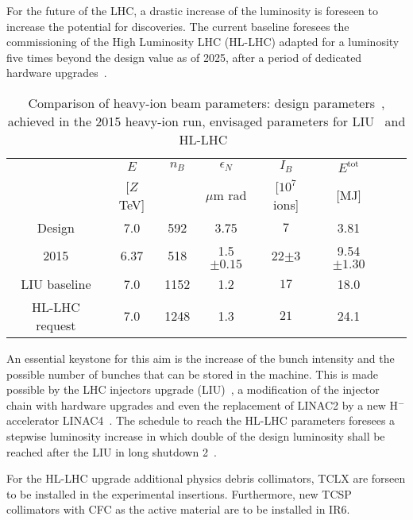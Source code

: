 For the future of the LHC, a drastic increase of the luminosity is foreseen to increase the potential for discoveries. The current baseline foresees the commissioning of the High Luminosity LHC (HL-LHC) adapted for a luminosity five times beyond the design value as of 2025, after a period of dedicated hardware upgrades~\cite{hllhc:asdhep}.
%
	\begin{table}[b]
		\centering
		\caption{Comparison of heavy-ion beam parameters: design parameters~\cite{CERN-2004-003-V1}, achieved in the 2015 heavy-ion run, envisaged parameters for LIU~\cite{IPAC11:WEPS017,IPAC2015:THPF093} and HL-LHC~\cite{}}
		\label{tab:LIU_HL_Parameters}
		
		\begin{tabular}{cccccccc}
			\toprule
			                        & $E$             & $n_B$   & $\epsilon_N$  & $I_B$             & $E^\text{tot}$     \\ %
			                        & {[}$Z$ TeV{]}	  &         &  $\mu$m rad   &  [$10^7$ ions]     & [MJ]             \\ \midrule
			Design                  & 7.0             & 592     & 3.75 & $7$               & 3.81             \\
			2015                    & 6.37            & 518     & 1.5$\pm 0.15$ & 22$\pm3$              & 9.54$\pm1.30$             \\
			LIU baseline            & 7.0             & 1152    & 1.2  & $17$              & 18.0             \\
			HL-LHC request          & 7.0             & 1248    & 1.3 & $21 $             & 24.1             \\ \bottomrule
		\end{tabular}
	\end{table}
%
An essential keystone for this aim is the increase of the bunch intensity and the possible number of bunches that can be stored in the machine. This is made possible by the LHC injectors upgrade (LIU)~\cite{IPAC11:WEPS017,IPAC2015:THPF093}, a modification of the injector chain with hardware upgrades and even the replacement of LINAC2 by a new H$^-$ accelerator LINAC4~\cite{IPAC2015:THPF093}. The schedule to reach the HL-LHC parameters foresees a stepwise luminosity increase in which double of the design luminosity shall be reached after the LIU in long shutdown 2~\cite{hllhc:asdhep}.



For the HL-LHC upgrade additional physics debris collimators, TCLX are forseen to be installed in the experimental insertions. Furthermore, new TCSP collimators with CFC as the active material are to be installed in IR6.

